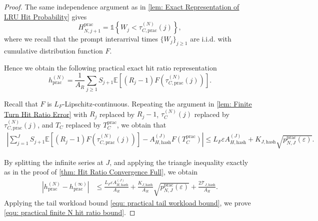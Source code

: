 \documentclass{article}
\theoremstyle{definition}
\newcommand{\E}{\mathbb E}
\newcommand{\one}{\mathds{1}}
\begin{document}
\begin{proof}
The same independence argument as in \cref{lem: Exact Representation of LRU Hit Probability} gives
\begin{equation*}
    H_{N,j+1}^{\mathrm{prac}} = \one\left\{W_j<\tau_{C,\mathrm{prac}}^{(N)}(j)\right\},
\end{equation*}
where we recall that the prompt interarrival times $\{W_j\}_{j\geq1}$ are i.i.d. with cumulative distribution function $F$.

Hence we obtain the following practical exact hit ratio representation
\begin{equation}
\label{equ: practical exact hit ratio representation}
    h_{ \mathrm{prac}}^{(N)} = \frac{1}{A_R} \sum_{j\geq1}S_{j+1} \E\left[(R_j-1)F(\tau_{C,\mathrm{prac}}^{(N)}(j))\right].
\end{equation}


Recall that $F$ is $L_F$-Lipschitz-continuous. Repeating the argument in \cref{lem: Finite Turn Hit Ratio Error} with $R_j$ replaced by $R_j-1$, $\tau_C^{(N)}(j)$ replaced by $\tau_{C,\mathrm{prac}}^{(N)}(j)$, and $T_C$ replaced by $T_C^{\mathrm{prac}}$, we obtain that
\begin{align*}
    \left|\sum_{j=1}^{J}S_{j+1}\E\left[(R_j-1)F\left(\tau_{C,\mathrm{prac}}^{(N)}(j)\right)\right]- A_{H,\mathrm{hash}}^{(J)}F(T_C^{\mathrm{prac}}) \right| \leq
    L_F \varepsilon A_{H,\mathrm{hash}}^{(J)}+ K_{J,\mathrm{hash}}\sqrt{p_{N,J}^{\mathrm{prac}}(\varepsilon)}.
\end{align*}

By splitting the infinite series at $J$, and applying the triangle inequality exactly as in the proof of \cref{thm: Hit Ratio Convergence Full}, we obtain
\begin{align*}
    \left|h_{ \mathrm{prac}}^{(N)}-h_{ \mathrm{prac}}^{(\infty)}\right|
    &\leq \frac{L_F \varepsilon A_{H,\mathrm{hash}}^{(J)}}{A_R} + \frac{K_{J,\mathrm{hash}}}{A_R}\sqrt{p_{N,J}^{\mathrm{prac}}(\varepsilon)} + \frac{2\mathcal T_{J,\mathrm{hash}}}{A_R}.
\end{align*}
Applying the tail workload bound \eqref{equ: practical tail workload bound}, we prove \eqref{equ: practical finite N hit ratio bound}.


\end{proof}
\end{document}
